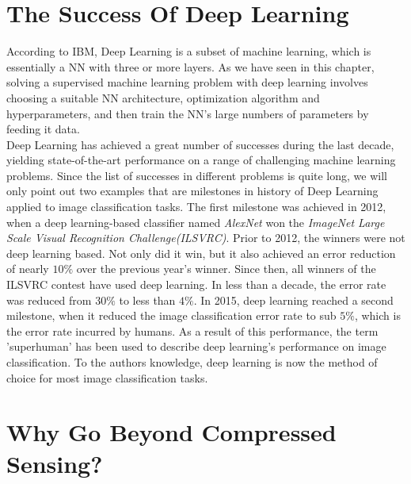 \section{The Success Of Deep Learning}
According to IBM, Deep Learning is a subset of machine learning, which is essentially a NN with three or more layers. As we have seen in this chapter, solving a supervised machine learning problem with deep learning involves choosing a suitable NN architecture, optimization algorithm and hyperparameters, and then train the NN's large numbers of parameters by feeding it data.  
\\Deep Learning has achieved a great number of successes during the last decade, yielding state-of-the-art performance on a range of challenging machine learning problems. Since the list of successes in different problems is quite long, we will only point out two examples that are milestones in history of Deep Learning applied to image classification tasks. The first milestone was achieved in 2012, when a deep learning-based classifier named \emph{AlexNet} won the \emph{ImageNet Large Scale Visual Recognition Challenge(ILSVRC)}. Prior to 2012, the winners were not deep learning based. Not only did it win, but it also achieved an error reduction of nearly $10\%$ over the previous year's winner. Since then, all winners of the ILSVRC contest have used deep learning. In less than a decade, the error rate was reduced from $30 \%$ to less than $4 \%$. In 2015, deep learning reached a second milestone, when it reduced the image classification error rate to sub $5 \%$, which is the error rate incurred by humans. As a result of this performance, the term 'superhuman' has been used to describe deep learning's performance on image classification. To the authors knowledge, deep learning is now the method of choice for most image classification tasks.
\section{Why Go Beyond Compressed Sensing?}








